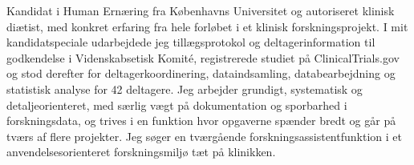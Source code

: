 \documentclass[11pt,a4paper,sans]{moderncv}
\begin{document}
\makecvtitle


\vspace{6pt}
\small{Kandidat i Human Ernæring fra Københavns Universitet og autoriseret klinisk diætist, med konkret erfaring fra hele forløbet i et klinisk forskningsprojekt. I mit kandidatspeciale udarbejdede jeg tillægsprotokol og deltagerinformation til godkendelse i Videnskabsetisk Komité, registrerede studiet på ClinicalTrials.gov og stod derefter for deltagerkoordinering, dataindsamling, databearbejdning og statistisk analyse for 42 deltagere. Jeg arbejder grundigt, systematisk og detaljeorienteret, med særlig vægt på dokumentation og sporbarhed i forskningsdata, og trives i en funktion hvor opgaverne spænder bredt og går på tværs af flere projekter. Jeg søger en tværgående forskningsassistentfunktion i et anvendelsesorienteret forskningsmiljø tæt på klinikken.}

\end{document}

